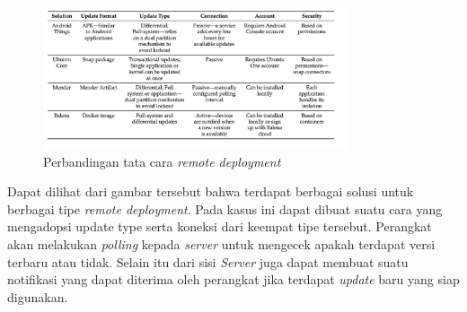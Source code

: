\begin{figure}[h]
  \centering
  \includegraphics[width=0.8\textwidth]{resources/chapter-2/perbandingan-remote-deployment.jpg}
  \caption{Perbandingan tata cara \textit{remote deployment} \parencite{RemoteDeployment}}
  \label{fig:comparison-remote-deployments}
\end{figure}

Dapat dilihat dari gambar tersebut bahwa terdapat berbagai solusi untuk berbagai tipe \textit{remote deployment}. Pada kasus ini dapat dibuat suatu cara yang mengadopsi update type serta koneksi dari keempat tipe tersebut. Perangkat akan melakukan \textit{polling} kepada \textit{server} untuk mengecek apakah terdapat versi terbaru atau tidak. Selain itu dari sisi \textit{Server} juga dapat membuat suatu notifikasi yang dapat diterima oleh perangkat jika terdapat \textit{update} baru yang siap digunakan.
